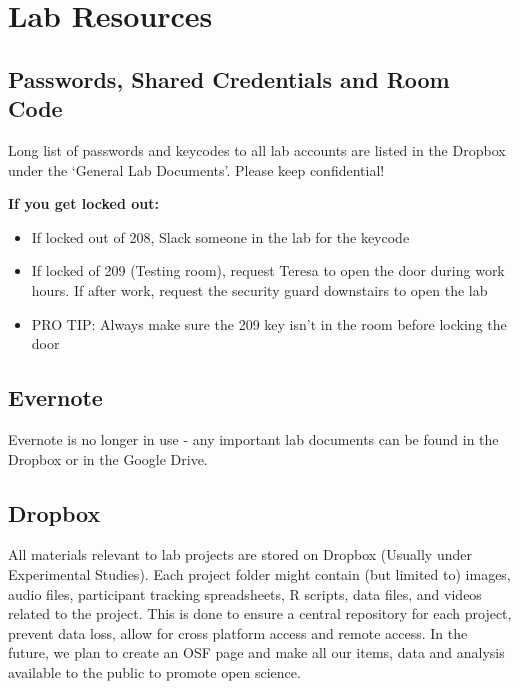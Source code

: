 \documentclass[
]{book}
\providecommand{\tightlist}{%
  \setlength{\itemsep}{0pt}\setlength{\parskip}{0pt}}
\begin{document}
\hypertarget{lab-resources}{%
\chapter{Lab Resources}\label{lab-resources}}

\hypertarget{passwords-shared-credentials-and-room-code}{%
\section{Passwords, Shared Credentials and Room Code}\label{passwords-shared-credentials-and-room-code}}

Long list of passwords and keycodes to all lab accounts are listed in the Dropbox under the `General Lab Documents'. Please keep confidential!

\textbf{If you get locked out:}

\begin{itemize}
\tightlist
\item
  If locked out of 208, Slack someone in the lab for the keycode
\item
  If locked of 209 (Testing room), request Teresa to open the door during work hours. If after work, request the security guard downstairs to open the lab
\item
  PRO TIP: Always make sure the 209 key isn't in the room before locking the door
\end{itemize}

\hypertarget{evernote-1}{%
\section{Evernote}\label{evernote-1}}

Evernote is no longer in use - any important lab documents can be found in the Dropbox or in the Google Drive.

\hypertarget{dropbox}{%
\section{Dropbox}\label{dropbox}}

All materials relevant to lab projects are stored on Dropbox (Usually under Experimental Studies). Each project folder might contain (but limited to) images, audio files, participant tracking spreadsheets, R scripts, data files, and videos related to the project. This is done to ensure a central repository for each project, prevent data loss, allow for cross platform access and remote access. In the future, we plan to create an OSF page and make all our items, data and analysis available to the public to promote open science.
\end{document}

